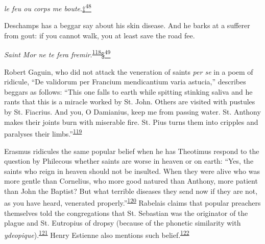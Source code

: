 \emph{le feu ou corps me
boute}.\protect\hypertarget{13_Chapter_Six__THE_DEPICTION_OF_TH.xhtmlux5cux23id_3071}{\protect\hyperlink{23_NOTES.xhtmlux5cux23id_3072}{‡\textsuperscript{48}}}

Deschamps has a beggar say about his skin disease. And he barks at a
sufferer from gout: if you cannot walk, you at least save the road fee.

\emph{Saint Mor ne te fera
fremir}.\textsuperscript{\protect\hypertarget{13_Chapter_Six__THE_DEPICTION_OF_TH.xhtmlux5cux23id_1037}{\protect\hyperlink{23_NOTES.xhtmlux5cux23id_1038}{118}}}\protect\hypertarget{13_Chapter_Six__THE_DEPICTION_OF_TH.xhtmlux5cux23id_3073}{\protect\hyperlink{23_NOTES.xhtmlux5cux23id_3074}{§\textsuperscript{49}}}

Robert Gaguin, who did not attack the veneration of saints \emph{per se}
in a poem of ridicule, ``De validorum per Francium
mendi\protect\hypertarget{13_Chapter_Six__THE_DEPICTION_OF_TH.xhtmlux5cux23page_200}{}{}cantium
varia astucia,'' describes beggars as follows: ``This one falls to earth
while spitting stinking saliva and he rants that this is a miracle
worked by St. John. Others are visited with pustules by St. Fiacrius.
And you, O Damianius, keep me from passing water. St. Anthony makes
their joints burn with miserable fire. St. Pius turns them into cripples
and paralyses their
limbs.''\textsuperscript{\protect\hypertarget{13_Chapter_Six__THE_DEPICTION_OF_TH.xhtmlux5cux23id_1035}{\protect\hyperlink{23_NOTES.xhtmlux5cux23id_1036}{119}}}

Erasmus ridicules the same popular belief when he has Theotimus respond
to the question by Philecous whether saints are worse in heaven or on
earth: ``Yes, the saints who reign in heaven should not be insulted.
When they were alive who was more gentle than Cornelius, who more good
natured than Anthony, more patient than John the Baptist? But what
terrible diseases they send now if they are not, as you have heard,
venerated
properly.''\textsuperscript{\protect\hypertarget{13_Chapter_Six__THE_DEPICTION_OF_TH.xhtmlux5cux23id_1033}{\protect\hyperlink{23_NOTES.xhtmlux5cux23id_1034}{120}}}
Rabelais claims that popular preachers themselves told the congregations
that St. Sebastian was the originator of the plague and St. Eutropius of
dropsy (because of the phonetic similarity with
\emph{ydeopique}).\textsuperscript{\protect\hypertarget{13_Chapter_Six__THE_DEPICTION_OF_TH.xhtmlux5cux23id_1031}{\protect\hyperlink{23_NOTES.xhtmlux5cux23id_1032}{121}}}
Henry Estienne also mentions such
belief.\textsuperscript{\protect\hypertarget{13_Chapter_Six__THE_DEPICTION_OF_TH.xhtmlux5cux23id_1029}{\protect\hyperlink{23_NOTES.xhtmlux5cux23id_1030}{122}}}

